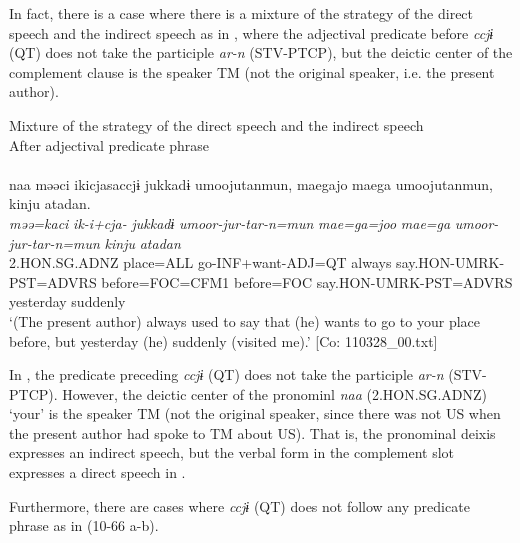  In fact, there is a case where there is a mixture of the strategy of the direct speech and the indirect speech as in , where the adjectival predicate before \textit{ccjɨ} (QT) does not take the participle \textit{ar-n} (STV-PTCP), but the deictic center of the complement clause is the speaker TM (not the original speaker, i.e. the present author).

\ea\label{ex:10.65}   Mixture of the strategy of the direct speech and the indirect speech\\
  After adjectival predicate phrase\\\\
      \glll    naa  məəci  ikicjasaccjɨ  jukkadɨ  umoojutanmun,  {\textbar}mae{\textbar}gajo  {\textbar}mae{\textbar}ga  umoojutanmun,  kinju  atadan.\\                                                                                                                                                     
    \textit{}  \textit{məə=kaci}  \textit{ik-i+cja-}  \textit{jukkadɨ}  \textit{umoor-jur-tar-n=mun}  \textit{mae=ga=joo}  \textit{mae=ga} \textit{umoor-jur-tar-n=mun}  \textit{kinju}  \textit{atadan}\\                                                                                                                                                     
    2.HON.SG.ADNZ  place=ALL  go-INF+want-ADJ=QT  always   say.HON-UMRK-PST=ADVRS  before=FOC=CFM1  before=FOC   say.HON-UMRK-PST=ADVRS  yesterday  suddenly\\
    \glt ‘(The present author) always used to say that (he) wants to go to your place before, but yesterday (he) suddenly (visited me).’ [Co: 110328\_00.txt]
\z

In , the predicate preceding \textit{ccjɨ} (QT) does not take the participle \textit{ar-n} (STV-PTCP). However, the deictic center of the pronominl \textit{naa} (2.HON.SG.ADNZ) ‘your’ is the speaker TM (not the original speaker, since there was not US when the present author had spoke to TM about US). That is, the pronominal deixis expresses an indirect speech, but the verbal form in the complement slot expresses a direct speech in .

  Furthermore, there are cases where \textit{ccjɨ} (QT) does not follow any predicate phrase as in (10-66 a-b).


